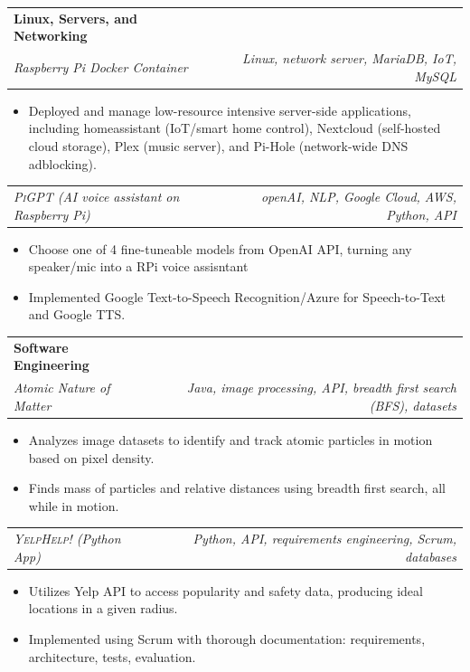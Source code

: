 \documentclass[a4paper,11pt]{article}
\makeatletter
\newcommand{\resumeSubheading}[4]{
    \vspace{0.5mm} \item[]
    \begin{tabular*}{0.98\textwidth}[t]{l@{\extracolsep{\fill}}r}
        \textbf{#1} & \textit{\footnotesize{#4}} \\
        \textit{\footnotesize{#3}} & \footnotesize{#2}\\
    \end{tabular*}
    \vspace{-2.4mm}
}
\newcommand{\resumeProject}[2]{
\vspace{0.5mm}\item[]
    \begin{tabular*}{0.98\textwidth}[t]{l@{\extracolsep{\fill}}r}
        \footnotesize{\textit{#1}} & \footnotesize{\textit{#2}}
    \end{tabular*}
    \vspace{-2.4mm}
}
\newcommand{\resumeItemListStart}{\begin{justify}\begin{itemize}[leftmargin=3ex, rightmargin=2ex, noitemsep,labelsep=1.2mm,itemsep=0mm]\small}
\newcommand{\resumeItemListEnd}{\end{itemize}\end{justify}\vspace{-2mm}}
\makeatother
\begin{document}
    \resumeSubheading
      {Linux, Servers, and Networking}{\textit{Linux, network server, MariaDB, IoT, MySQL}}{Raspberry Pi Docker Container}{} %
      \vspace{-3.0mm}

      \resumeItemListStart
        \item {Deployed and manage low-resource intensive server-side applications, including homeassistant (IoT/smart home control), Nextcloud (self-hosted cloud storage), Plex (music server), and Pi-Hole (network-wide DNS adblocking).}
        
    \resumeItemListEnd
    \vspace{-5mm}

    \resumeProject
      {\textsc{PiGPT} (AI voice assistant on Raspberry Pi)}%
      {openAI, NLP, Google Cloud, AWS, Python, API} %
      \vspace{-3.0mm}

      \resumeItemListStart
        \item {Choose one of 4 fine-tuneable models from OpenAI API, turning any speaker/mic into a RPi voice assisntant }
        \item {Implemented Google Text-to-Speech Recognition/Azure for Speech-to-Text and Google TTS.}
    \resumeItemListEnd
    \vspace{-5mm}
    
    \resumeSubheading
      {Software Engineering}{\textit{Java, image processing, API, breadth first search (BFS), datasets}}{Atomic Nature of Matter}{} %
      \vspace{-3.0mm}

      \resumeItemListStart
        \item {Analyzes image datasets to identify and track atomic particles in motion based on pixel density.}
        \item {Finds mass of particles and relative distances using breadth first search, all while in motion.}
    
    \resumeItemListEnd
    \vspace{-5mm}

    \resumeProject
      {\textsc{YelpHelp!} (Python App)} %
      {Python, API, requirements engineering, Scrum, databases} %
      \vspace{-3.0mm}

      \resumeItemListStart
        \item {Utilizes Yelp API to access popularity and safety data, producing ideal locations in a given radius.}
        \item {Implemented using Scrum with thorough documentation: requirements, architecture, tests, evaluation.}
    \resumeItemListEnd
    \vspace{-5mm}
      
\end{document}
